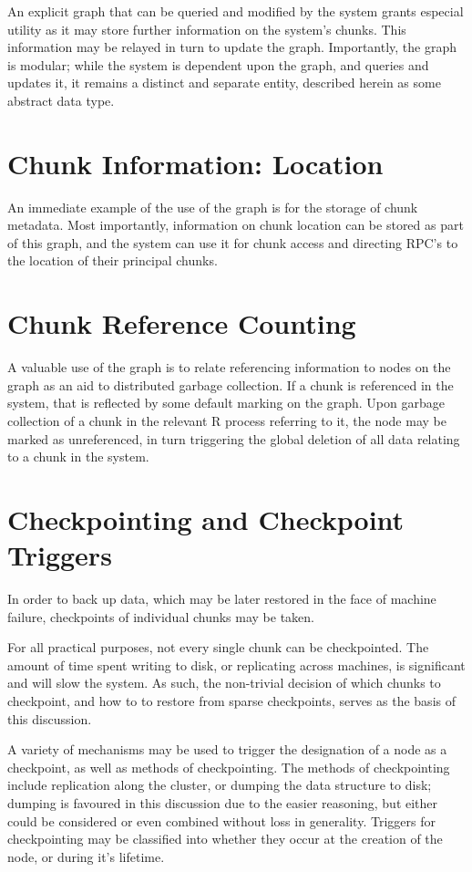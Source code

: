 \documentclass[10pt, a4paper]{article}
\begin{document}
An explicit graph that can be queried and modified by the system grants especial utility as it may store further information on the system's chunks.
This information may be relayed in turn to update the graph.
Importantly, the graph is modular; while the system is dependent upon the graph, and queries and updates it, it remains a distinct and separate entity, described herein as some abstract data type.

\section{Chunk Information: Location}

An immediate example of the use of the graph is for the storage of chunk metadata.
Most importantly, information on chunk location can be stored as part of this graph, and the system can use it for chunk access and directing RPC's to the location of their principal chunks.

\section{Chunk Reference Counting}

A valuable use of the graph is to relate referencing information to nodes on the graph as an aid to distributed garbage collection.
If a chunk is referenced in the system, that is reflected by some default marking on the graph.
Upon garbage collection of a chunk in the relevant R process referring to it, the node may be marked as unreferenced, in turn triggering the global deletion of all data relating to a chunk in the system.

\section{Checkpointing and Checkpoint Triggers}

In order to back up data, which may be later restored in the face of machine failure, checkpoints of individual chunks may be taken.

For all practical purposes, not every single chunk can be checkpointed.
The amount of time spent writing to disk, or replicating across machines, is significant and will slow the system.
As such, the non-trivial decision of which chunks to checkpoint, and how to to restore from sparse checkpoints, serves as the basis of this discussion.

A variety of mechanisms may be used to trigger the designation of a node as a checkpoint, as well as methods of checkpointing.
The methods of checkpointing include replication along the cluster, or dumping the data structure to disk; dumping is favoured in this discussion due to the easier reasoning, but either could be considered or even combined without loss in generality.
Triggers for checkpointing may be classified into whether they occur at the creation of the node, or during it's lifetime.
\end{document}
